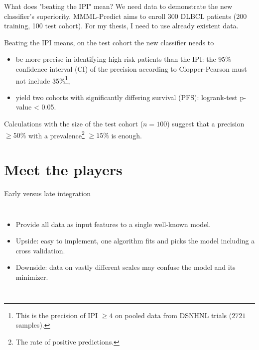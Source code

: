 \documentclass[10pt, aspectratio=169]{beamer}
\begin{document}
\begin{frame}{What does "beating the IPI" mean?}
  We need data to demonstrate the new classifier's superiority. MMML-Predict aims to enroll 300 DLBCL 
  patients (200 training, 100 test cohort). For my thesis, I need to use already existent data.

  \pause
  Beating the IPI means, on the test cohort the new classifier needs to 

  \begin{itemize}
    \item be \alert{more precise in identifying high-risk patients} than the IPI: the 95\% confidence interval (CI) 
    of the precision according to Clopper-Pearson  
    must not include 35\%\footnote{This is the  precision of IPI $\geq 4$ on pooled data from DSNHNL trials 
    ($\num{2721}$ samples).},
    \item yield \alert{two cohorts with significantly differing survival} (PFS): logrank-test p-value < 0.05.
  \end{itemize}

  \pause
  Calculations with the size of the test cohort ($n = 100$) suggest that a precision $\geq 50\%$ with a 
  prevalence\footnote{The rate of positive predictions.} $\geq 15\%$ is enough.
\end{frame}

\section{Meet the players}

\begin{frame}{\alert{Early} versus late integration}
  \begin{columns}
      \centering
      \begin{itemize}
        \item Provide all data as input features to a single well-known model.
        \item Upside: easy to implement, one algorithm fits and picks the model 
          including a cross validation.
        \item Downside: data on vastly different scales may confuse the model and 
          its minimizer.
      \end{itemize}
  \end{columns}
\end{frame}
\end{document}

